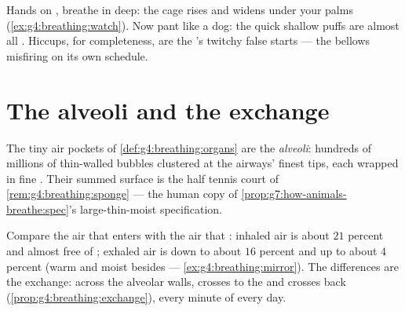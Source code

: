 \begin{example}\label{ex:g7:lungs-and-gas-exchange:feel}
Hands on , breathe in deep: the cage rises and widens
under your palms (\cref{ex:g4:breathing:watch}). Now pant
like a dog: the quick shallow puffs are almost all
. Hiccups, for completeness, are the 's
twitchy false starts --- the bellows misfiring on its own
schedule.
\end{example}

\section{The alveoli and the exchange}

\begin{definition}[Alveoli]\label{def:g7:lungs-and-gas-exchange:alveoli}
The tiny air pockets of \cref{def:g4:breathing:organs} are
the \emph{alveoli}: hundreds of millions
of thin-walled bubbles clustered at the airways' finest
tips, each wrapped in fine . Their summed
surface is the half tennis court of
\cref{rem:g4:breathing:sponge} --- the human copy of
\cref{prop:g7:how-animals-breathe:spec}'s
large-thin-moist specification.
\end{definition}

\begin{proposition}\label{prop:g7:lungs-and-gas-exchange:numbers}
Compare the air that enters with the air that :
inhaled air is about $21$ percent  and almost free
of ; exhaled air is down to about $16$
percent  and up to about $4$ percent  (warm and moist besides ---
\cref{ex:g4:breathing:mirror}). The differences are the
exchange: across the alveolar walls,  crosses to
the  and  crosses back
(\cref{prop:g4:breathing:exchange}), every minute of
every day.
\end{proposition}
\admitted

